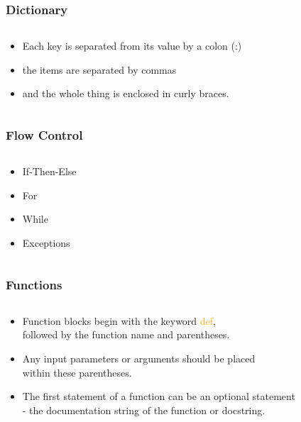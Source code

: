 \documentclass{beamer}
\begin{document}
\begin{frame}
	\frametitle{Dictionary}
	\begin{columns}[c]
		\begin{column}{30cm}
			\vspace{.1cm}
			\begin{itemize}
				\justifying
				\item Each key is separated from its value by a colon (:)
				\item the items are separated by commas
				\item and the whole thing is enclosed in curly braces.
			\end{itemize}
		\end{column}
	\end{columns}
\end{frame}

\begin{frame}
	\frametitle{Flow Control}
	\begin{columns}[c]
		\begin{column}{30cm}
			\vspace{.1cm}
			\begin{itemize}
				\justifying
				\item If-Then-Else
				\item For
				\item While
				\item Exceptions
			\end{itemize}
		\end{column}
	\end{columns}
	\vspace{.5cm}
	\hspace*{5.5cm}
\end{frame}

\begin{frame}
	\frametitle{Functions}
	\begin{columns}[c]
		\begin{column}{30cm}
			\vspace{.1cm}
			\begin{itemize}
				\justifying
				\item Function blocks begin with the keyword \textcolor{orange}{def}, \\
				followed by the function name and parentheses.
				\item Any input parameters or arguments should be placed \\
				within these parentheses.
				\item The first statement of a function can be an optional statement \\
				- the documentation string of the function or docstring.
			\end{itemize}
		\end{column}
	\end{columns}
\end{frame}
\end{document}
